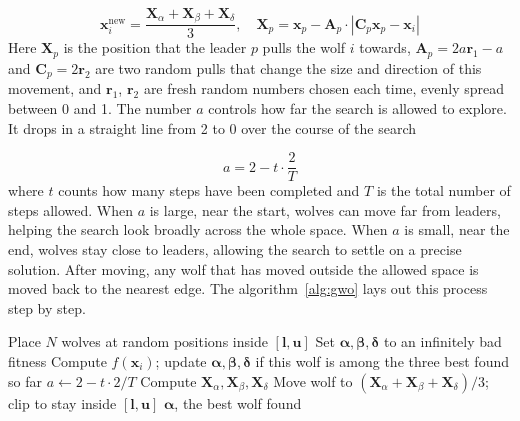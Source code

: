 \documentclass[journal]{IEEEtran}
\begin{document}
\begin{equation}
\mathbf{x}_i^{\text{new}} = \frac{\mathbf{X}_\alpha + \mathbf{X}_\beta + \mathbf{X}_\delta}{3}, \quad
\mathbf{X}_p = \mathbf{x}_p - \mathbf{A}_p \cdot |\mathbf{C}_p \mathbf{x}_p - \mathbf{x}_i|
\end{equation}
Here $\mathbf{X}_p$ is the position that the leader $p$ pulls the wolf $i$ towards, $\mathbf{A}_p = 2a\mathbf{r}_1 - a$ and $\mathbf{C}_p = 2\mathbf{r}_2$ are two random pulls that change the size and direction of this movement, and $\mathbf{r}_1$, $\mathbf{r}_2$ are fresh random numbers chosen each time, evenly spread between 0 and 1. The number $a$ controls how far the search is allowed to explore. It
drops in a straight line from 2 to 0 over the course of the search

\begin{equation}
a = 2 - t \cdot \frac{2}{T}
\end{equation}
where $t$ counts how many steps have been completed and $T$ is the total number of steps allowed. When $a$ is large, near the start, wolves can move far from leaders, helping the search look broadly across the whole space. When $a$ is small, near the end, wolves stay close to leaders, allowing the search to settle on a precise solution. After moving, any wolf that has moved outside the allowed space is moved back to the nearest edge. The algorithm~\ref{alg:gwo} lays out this process step by step.

\begin{algorithm}[h]
\caption{Grey Wolf Optimizer}
\label{alg:gwo}
\begin{algorithmic}[1]
\State Place $N$ wolves at random positions inside $[\mathbf{l}, \mathbf{u}]$
\State Set $\boldsymbol{\alpha}, \boldsymbol{\beta}, \boldsymbol{\delta}$ to an infinitely bad fitness
        \State Compute $f(\mathbf{x}_i)$; update $\boldsymbol{\alpha}, \boldsymbol{\beta}, \boldsymbol{\delta}$ if this wolf is among the three best found so far
    \EndFor
    \State $a \gets 2 - t \cdot 2/T$
        \State Compute $\mathbf{X}_\alpha, \mathbf{X}_\beta, \mathbf{X}_\delta$
        \State Move wolf to $(\mathbf{X}_\alpha + \mathbf{X}_\beta + \mathbf{X}_\delta)/3$; clip to stay inside $[\mathbf{l}, \mathbf{u}]$
    \EndFor
\EndFor
\State \Return $\boldsymbol{\alpha}$, the best wolf found
\end{algorithmic}
\end{algorithm}
\end{document}
